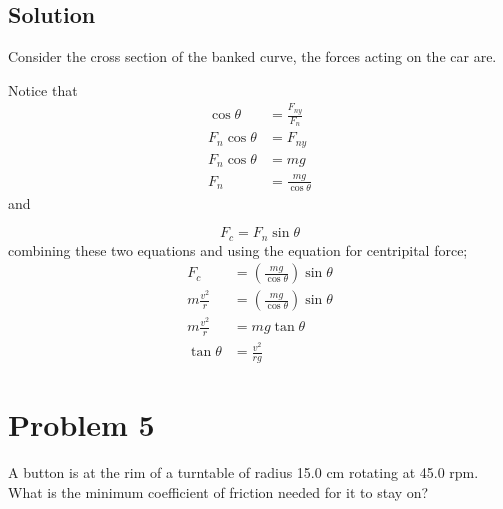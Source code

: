\documentclass{article}
\begin{document}
\subsection*{Solution}
Consider the cross section of the banked curve, the forces acting on the car are.

\begin{center}
\end{center}
Notice that
\begin{align*}
	\cos \theta &= \frac{F_{ny}}{F_n} \\
	F_n \cos \theta &= F_{ny} \\
	F_n \cos \theta &= mg \\
	F_n &= \frac{mg}{\cos\theta}
\end{align*}
and

\[
	F_c = F_n \sin\theta
\]
combining these two equations and using the equation for centripital force;
\begin{align*}
	F_c &= \left(\frac{mg}{\cos\theta}\right)\sin\theta \\
	m\frac{v^2}{r} &= \left(\frac{mg}{\cos\theta}\right)\sin\theta \\
	m\frac{v^2}{r} &= mg \tan \theta \\
	\tan\theta &= \frac{v^2}{rg}
\end{align*}

\section*{Problem 5}
A button is at the rim of a turntable of radius 15.0 cm rotating at 45.0 rpm. What is the
minimum coefficient of friction needed for it to stay on?
\end{document}
